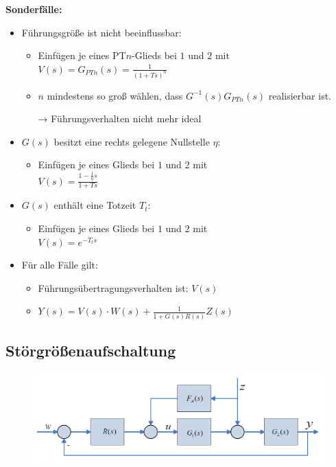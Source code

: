 \documentclass[10pt,a4paper]{article}
\begin{document}
\textbf{Sonderfälle:}
\begin{itemize}
	\item Führungsgröße ist nicht beeinflussbar:
	\begin{itemize}
		\item Einfügen je eines PT$n$-Glieds bei $1$ und $2$ mit \\
		$V(s) = G_{PTn}(s) = \frac{1}{(1 + Ts)^n}$
		\item $n$ mindestens so groß wählen, dass $G^{-1}(s)G_{PTn}(s)$ realisierbar ist.
		\item[→] Führungsverhalten nicht mehr ideal
	\end{itemize}
	\item $G(s)$ besitzt eine rechts gelegene Nullstelle $\eta$:
	\begin{itemize}
		\item Einfügen je eines Glieds bei $1$ und $2$ mit \\
		$V(s) = \frac{1 - \frac 1 \eta s}{1 + Ts}$
	\end{itemize}
	\item  $G(s)$ enthält eine Totzeit $T_t$:
	\begin{itemize}
		\item Einfügen je eines Glieds bei $1$ und $2$ mit \\
		$V(s) = e^{-T_ts}$
	\end{itemize}
	\item Für alle Fälle gilt:
	\begin{itemize}
		\item Führungsübertragungsverhalten ist: $V(s)$
		\item $Y(s) = V(s) ⋅ W(s) + \frac{1}{1 + G(s) R(s)} Z(s)$
	\end{itemize}
	
\end{itemize}

\subsection{Störgrößenaufschaltung}
\begin{figure}[H]
	\includegraphics[width=0.7\columnwidth]{imgs/abb7_4.png}
\end{figure}
\end{document}
